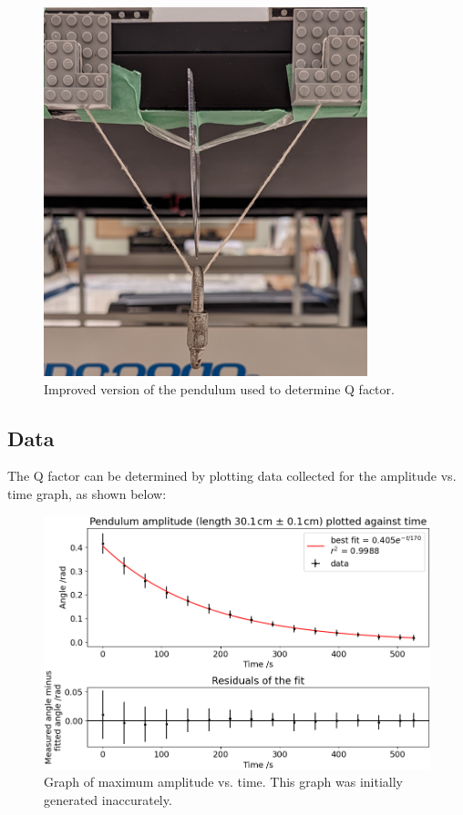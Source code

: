 \documentclass[11pt]{article}
\begin{document}
\begin{multicols}{2}
\begin{figure}[H]
    \centering
    \includegraphics[width=\linewidth]{../figures/exp_setup3_front.png}
    \caption{\centering Improved version of the pendulum used to determine Q factor.}
    \label{fig:figure 3}
\end{figure}


\subsection{Data} \label{sec 4.2 data}
The Q factor can be determined by plotting
 data collected for the amplitude vs. time graph, as shown below:

\begin{figure}[H]
    \centering
    \includegraphics[width=\linewidth]{../figures/max_amplitude_vs_time.png}
    \caption{\centering Graph of maximum amplitude vs. time. This graph was initially generated inaccurately.}
    \label{fig:figure 4}
\end{figure}


\end{multicols}
\end{document}
